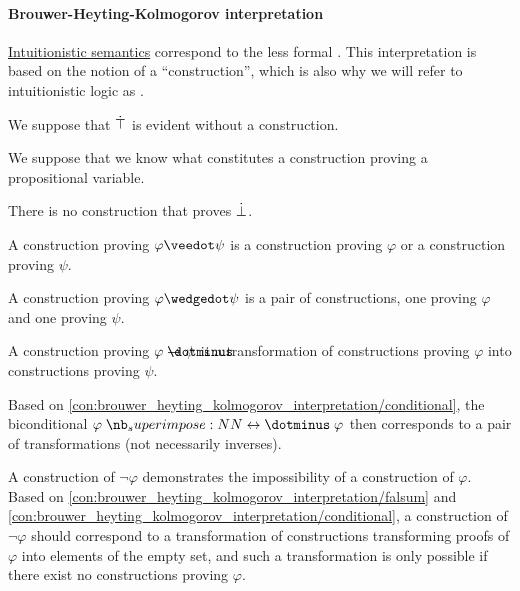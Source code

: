 \paragraph{Brouwer-Heyting-Kolmogorov interpretation}

\begin{concept}\label{con:brouwer_heyting_kolmogorov_interpretation}
  \hyperref[def:propositional_semantics]{Intuitionistic semantics} correspond to the less formal . This interpretation is based on the notion of a \enquote{construction}, which is also why we will refer to intuitionistic logic as .

  \begin{thmenum}
     We suppose that \( \dot{\top} \) is evident without a construction.

     We suppose that we know what constitutes a construction proving a propositional variable.

     There is no construction that proves \( \dot{\bot} \).

     A construction proving \( \varphi \synvee \psi \) is a construction proving \( \varphi \) or a construction proving \( \psi \).

     A construction proving \( \varphi \synwedge \psi \) is a pair of constructions, one proving \( \varphi \) and one proving \( \psi \).

     A construction proving \( \varphi \synimplies \psi \) is a transformation of constructions proving \( \varphi \) into constructions proving \( \psi \).

     Based on \cref{con:brouwer_heyting_kolmogorov_interpretation/conditional}, the biconditional \( \varphi \syniff \varphi \) then corresponds to a pair of transformations (not necessarily inverses).

     A construction of \( \neg \varphi \) demonstrates the impossibility of a construction of \( \varphi \). Based on \cref{con:brouwer_heyting_kolmogorov_interpretation/falsum} and \cref{con:brouwer_heyting_kolmogorov_interpretation/conditional}, a construction of \( \neg \varphi \) should correspond to a transformation of constructions transforming proofs of \( \varphi \) into elements of the empty set, and such a transformation is only possible if there exist no constructions proving \( \varphi \).
  \end{thmenum}
\end{concept}


